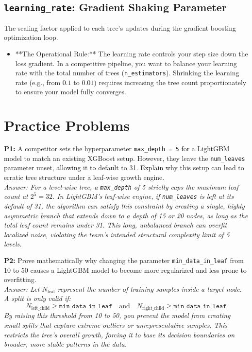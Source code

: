 \documentclass{article}
\begin{document}
\subsection{\texttt{learning\_rate}: Gradient Shaking Parameter}
The scaling factor applied to each tree's updates during the gradient boosting optimization loop.
\begin{itemize}
    \item **The Operational Rule:** The learning rate controls your step size down the loss gradient. In a competitive pipeline, you want to balance your learning rate with the total number of trees (\texttt{n\_estimators}). Shrinking the learning rate (e.g., from $0.1$ to $0.01$) requires increasing the tree count proportionately to ensure your model fully converges.
\end{itemize}

\newpage
\section{Practice Problems}

\textbf{P1:} A competitor sets the hyperparameter \texttt{max\_depth = 5} for a LightGBM model to match an existing XGBoost setup. However, they leave the \texttt{num\_leaves} parameter unset, allowing it to default to 31. Explain why this setup can lead to erratic tree structure under a leaf-wise growth engine.
\\
\textit{Answer: For a level-wise tree, a \texttt{max\_depth} of 5 strictly caps the maximum leaf count at $2^5 = 32$. In LightGBM's leaf-wise engine, if \texttt{num\_leaves} is left at its default of 31, the algorithm can satisfy this constraint by creating a single, highly asymmetric branch that extends down to a depth of 15 or 20 nodes, as long as the total leaf count remains under 31. This long, unbalanced branch can overfit localized noise, violating the team's intended structural complexity limit of 5 levels.}

\newline
\textbf{P2:} Prove mathematically why changing the parameter \texttt{min\_data\_in\_leaf} from 10 to 50 causes a LightGBM model to become more regularized and less prone to overfitting.
\\
\textit{Answer: Let $N_{\text{leaf}}$ represent the number of training samples inside a target node. A split is only valid if:
\begin{equation*}
    N_{\text{left\_child}} \ge \texttt{min\_data\_in\_leaf} \quad \text{and} \quad N_{\text{right\_child}} \ge \texttt{min\_data\_in\_leaf}
\end{equation*}
By raising this threshold from 10 to 50, you prevent the model from creating small splits that capture extreme outliers or unrepresentative samples. This restricts the tree's overall growth, forcing it to base its decision boundaries on broader, more stable patterns in the data.}
\end{document}
